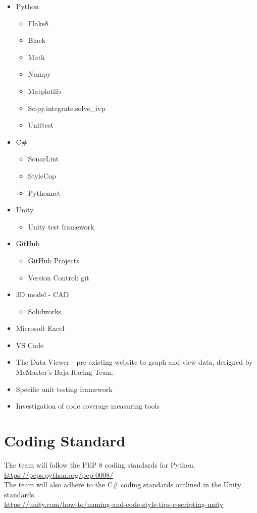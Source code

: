 \documentclass{article}
\begin{document}
\begin{itemize}
\item Python
\begin{itemize}
  \item Flake8
  \item Black
  \item Math
  \item Numpy
  \item Matplotlib
  \item Scipy.integrate.solve\_ivp
  \item Unittest
\end{itemize}
\item C\#
\begin{itemize}
  \item SonarLint
  \item StyleCop
  \item Pythonnet
\end{itemize}
\item Unity
\begin{itemize}
  \item Unity test framework
\end{itemize}
\item GitHub
\begin{itemize}
  \item GitHub Projects
  \item Version Control: git
\end{itemize}
\item 3D model - CAD
\begin{itemize}
  \item Solidworks
\end{itemize}
\item Microsoft Excel
\item VS Code
\item The Data Viewer - pre-existing website to graph and view data, designed by McMaster's Baja Racing Team.
\item Specific unit testing framework
\item Investigation of code coverage measuring tools
\end{itemize}

\section{Coding Standard}

The team will follow the PEP 8 coding standards for Python.
\\
\url{https://peps.python.org/pep-0008/}
\\
\noindent The team will also adhere to the C\# coding standards outlined in the Unity standards.
\\
\url{https://unity.com/how-to/naming-and-code-style-tips-c-scripting-unity}
\end{document}
